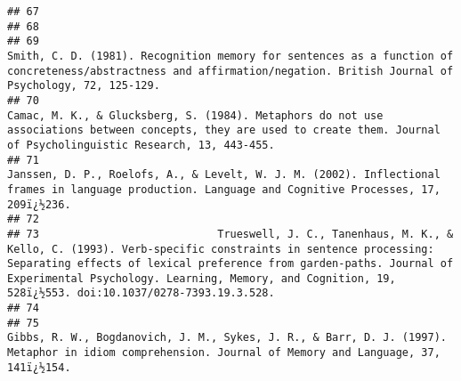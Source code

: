 \documentclass[
  english,
  man]{apa6}
\begin{document}
\begin{verbatim}
## 67                                                                                                                                                                                                                                                                                                                     
## 68                                                                                                                                                                                                                                                                                                                     
## 69                                                                                                                                               Smith, C. D. (1981). Recognition memory for sentences as a function of concreteness/abstractness and affirmation/negation. British Journal of Psychology, 72, 125-129.
## 70                                                                                                                                          Camac, M. K., & Glucksberg, S. (1984). Metaphors do not use associations between concepts, they are used to create them. Journal of Psycholinguistic Research, 13, 443-455.
## 71                                                                                                                                                                 Janssen, D. P., Roelofs, A., & Levelt, W. J. M. (2002). Inflectional frames in language production. Language and Cognitive Processes, 17, 209ï¿½236.
## 72                                                                                                                                                                                                                                                                                                                     
## 73                            Trueswell, J. C., Tanenhaus, M. K., & Kello, C. (1993). Verb-specific constraints in sentence processing: Separating effects of lexical preference from garden-paths. Journal of Experimental Psychology. Learning, Memory, and Cognition, 19, 528ï¿½553. doi:10.1037/0278-7393.19.3.528.
## 74                                                                                                                                                                                                                                                                                                                     
## 75                                                                                                                                                                Gibbs, R. W., Bogdanovich, J. M., Sykes, J. R., & Barr, D. J. (1997). Metaphor in idiom comprehension. Journal of Memory and Language, 37, 141ï¿½154.

\end{verbatim}
\end{document}
